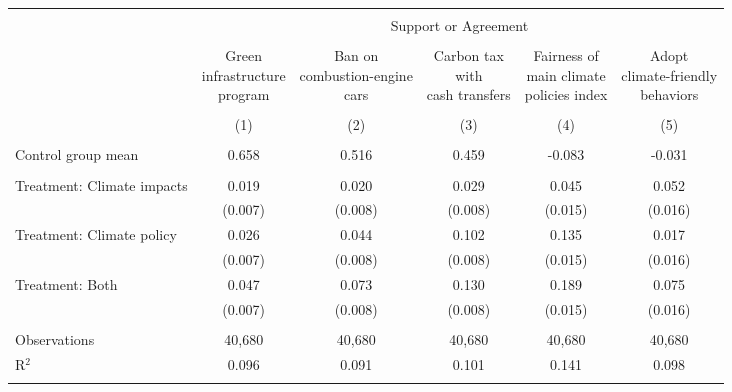 
\begin{tabular}{@{\extracolsep{5pt}}lccccc} 
\\[-1.8ex]\hline 
\hline \\[-1.8ex] 
 & \multicolumn{5}{c}{Support or Agreement} \\ 
\cline{2-6} 
\\[-1.8ex] & \makecell{Green\\infrastructure\\program} & \makecell{Ban on\\combustion-engine\\cars} & \makecell{Carbon tax\\with\\cash transfers} & \makecell{Fairness of\\main climate\\policies index} & \makecell{Adopt\\climate-friendly\\behaviors} \\ 
\\[-1.8ex] & (1) & (2) & (3) & (4) & (5)\\ 
\hline \\[-1.8ex] 
Control group mean & 0.658 & 0.516 & 0.459 & -0.083 & -0.031  \\ \hline \\[-1.8ex]
 Treatment: Climate impacts & 0.019 & 0.020 & 0.029 & 0.045 & 0.052 \\ 
  & (0.007) & (0.008) & (0.008) & (0.015) & (0.016) \\ 
  Treatment: Climate policy & 0.026 & 0.044 & 0.102 & 0.135 & 0.017 \\ 
  & (0.007) & (0.008) & (0.008) & (0.015) & (0.016) \\ 
  Treatment: Both & 0.047 & 0.073 & 0.130 & 0.189 & 0.075 \\ 
  & (0.007) & (0.008) & (0.008) & (0.015) & (0.016) \\ 
 \hline \\[-1.8ex] 

Observations & 40,680 & 40,680 & 40,680 & 40,680 & 40,680 \\ 
R$^{2}$ & 0.096 & 0.091 & 0.101 & 0.141 & 0.098 \\ 
\hline 
\hline \\[-1.8ex] 
\end{tabular} 